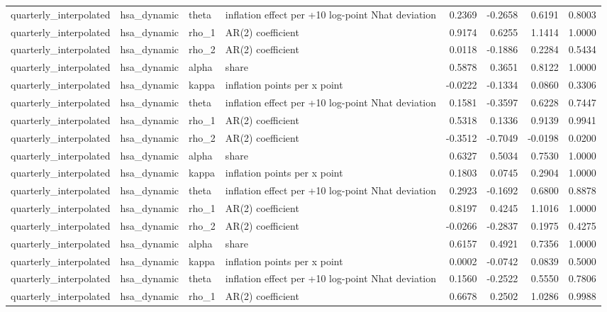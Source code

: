\begin{tabular}{llllrrrr}
quarterly\_interpolated & hsa\_dynamic & theta & inflation effect per +10 log-point Nhat deviation & 0.2369 & -0.2658 & 0.6191 & 0.8003 \\
quarterly\_interpolated & hsa\_dynamic & rho\_1 & AR(2) coefficient & 0.9174 & 0.6255 & 1.1414 & 1.0000 \\
quarterly\_interpolated & hsa\_dynamic & rho\_2 & AR(2) coefficient & 0.0118 & -0.1886 & 0.2284 & 0.5434 \\
quarterly\_interpolated & hsa\_dynamic & alpha & share & 0.5878 & 0.3651 & 0.8122 & 1.0000 \\
quarterly\_interpolated & hsa\_dynamic & kappa & inflation points per x point & -0.0222 & -0.1334 & 0.0860 & 0.3306 \\
quarterly\_interpolated & hsa\_dynamic & theta & inflation effect per +10 log-point Nhat deviation & 0.1581 & -0.3597 & 0.6228 & 0.7447 \\
quarterly\_interpolated & hsa\_dynamic & rho\_1 & AR(2) coefficient & 0.5318 & 0.1336 & 0.9139 & 0.9941 \\
quarterly\_interpolated & hsa\_dynamic & rho\_2 & AR(2) coefficient & -0.3512 & -0.7049 & -0.0198 & 0.0200 \\
quarterly\_interpolated & hsa\_dynamic & alpha & share & 0.6327 & 0.5034 & 0.7530 & 1.0000 \\
quarterly\_interpolated & hsa\_dynamic & kappa & inflation points per x point & 0.1803 & 0.0745 & 0.2904 & 1.0000 \\
quarterly\_interpolated & hsa\_dynamic & theta & inflation effect per +10 log-point Nhat deviation & 0.2923 & -0.1692 & 0.6800 & 0.8878 \\
quarterly\_interpolated & hsa\_dynamic & rho\_1 & AR(2) coefficient & 0.8197 & 0.4245 & 1.1016 & 1.0000 \\
quarterly\_interpolated & hsa\_dynamic & rho\_2 & AR(2) coefficient & -0.0266 & -0.2837 & 0.1975 & 0.4275 \\
quarterly\_interpolated & hsa\_dynamic & alpha & share & 0.6157 & 0.4921 & 0.7356 & 1.0000 \\
quarterly\_interpolated & hsa\_dynamic & kappa & inflation points per x point & 0.0002 & -0.0742 & 0.0839 & 0.5000 \\
quarterly\_interpolated & hsa\_dynamic & theta & inflation effect per +10 log-point Nhat deviation & 0.1560 & -0.2522 & 0.5550 & 0.7806 \\
quarterly\_interpolated & hsa\_dynamic & rho\_1 & AR(2) coefficient & 0.6678 & 0.2502 & 1.0286 & 0.9988 \\

\end{tabular}
